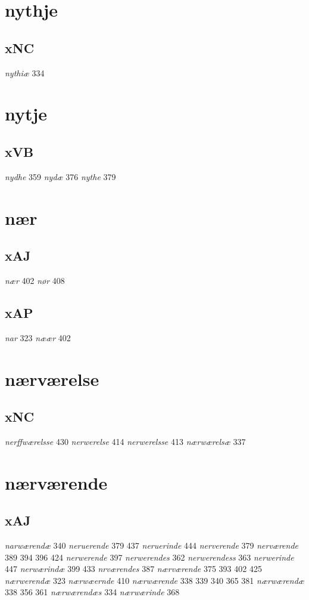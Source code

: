 \documentclass[a4paper,twocolumn]{article}
\begin{document}
\section{nythje}
\label{sec:orga0976b2}
\subsection{xNC}
\label{sec:org3f6444b}
\emph{nythiæ} 334 
\section{nytje}
\label{sec:org4333901}
\subsection{xVB}
\label{sec:org164df79}
\emph{nydhe} 359 \emph{nydæ} 376 \emph{nythe} 379 
\section{nær}
\label{sec:org513d3ce}
\subsection{xAJ}
\label{sec:orge2f87e5}
\emph{nær} 402 \emph{nør} 408 
\subsection{xAP}
\label{sec:orgf3e19d3}
\emph{nar} 323 \emph{næær} 402 
\section{nærværelse}
\label{sec:org53d72c8}
\subsection{xNC}
\label{sec:orge26197e}
\emph{nerffwærelsse} 430 \emph{nerwerelse} 414 \emph{nerwerelsse} 413 \emph{nærwærelsæ} 337 
\section{nærværende}
\label{sec:org41756bb}
\subsection{xAJ}
\label{sec:org698de60}
\emph{narwærendæ} 340 \emph{neruerende} 379 437 \emph{neruerinde} 444 \emph{nerverende} 379 \emph{nerværende} 389 394 396 424 \emph{nerwerende} 397 \emph{nerwerendes} 362 \emph{nerwerendess} 363 \emph{nerwerinde} 447 \emph{nerwærindæ} 399 433 \emph{nrværendes} 387 \emph{nærværende} 375 393 402 425 \emph{nærwerendæ} 323 \emph{nærwæernde} 410 \emph{nærwærende} 338 339 340 365 381 \emph{nærwærendæ} 338 356 361 \emph{nærwærendæs} 334 \emph{nærwærinde} 368 
\end{document}
